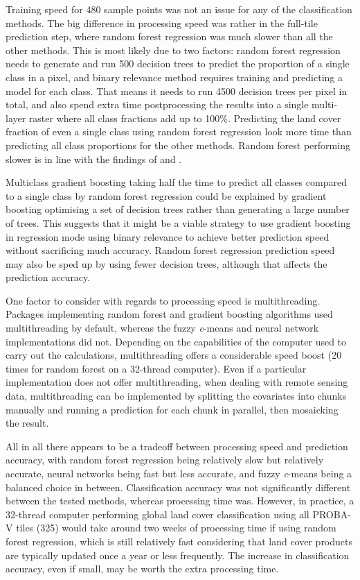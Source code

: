 \documentclass[a4paper,12pt]{scrbook}
\begin{document}
Training speed for 480 sample points was not an issue for any of the classification methods. The big difference in processing speed was rather in the full-tile prediction step, where random forest regression was much slower than all the other methods. This is most likely due to two factors: random forest regression needs to generate and run 500 decision trees to predict the proportion of a single class in a pixel, and binary relevance method requires training and predicting a model for each class. That means it needs to run 4500 decision trees per pixel in total, and also spend extra time postprocessing the results into a single multi-layer raster where all class fractions add up to 100\%. Predicting the land cover fraction of even a single class using random forest regression look more time than predicting all class proportions for the other methods. Random forest performing slower is in line with the findings of \citet{walton2008subpixelrf} and \citet{Pelletier2016hardrf}.

Multiclass gradient boosting taking half the time to predict all classes compared to a single class by random forest regression could be explained by gradient boosting optimising a set of decision trees rather than generating a large number of trees. This suggests that it might be a viable strategy to use gradient boosting in regression mode using binary relevance to achieve better prediction speed without sacrificing much accuracy. Random forest regression prediction speed may also be sped up by using fewer decision trees, although that affects the prediction accuracy.

One factor to consider with regards to processing speed is multithreading. Packages implementing random forest and gradient boosting algorithms used multithreading by default, whereas the fuzzy \textit{c}-means and neural network implementations did not. Depending on the capabilities of the computer used to carry out the calculations, multithreading offers a considerable speed boost (20 times for random forest on a 32-thread computer). Even if a particular implementation does not offer multithreading, when dealing with remote sensing data, multithreading can be implemented by splitting the covariates into chunks manually and running a prediction for each chunk in parallel, then mosaicking the result.

All in all there appears to be a tradeoff between processing speed and prediction accuracy, with random forest regression being relatively slow but relatively accurate, neural networks being fast but less accurate, and fuzzy \textit{c}-means being a balanced choice in between. Classification accuracy was not significantly different between the tested methods, whereas processing time was. However, in practice, a 32-thread computer performing global land cover classification using all PROBA-V tiles (325) would take around two weeks of processing time if using random forest regression, which is still relatively fast considering that land cover products are typically updated once a year or less frequently. The increase in classification accuracy, even if small, may be worth the extra processing time.
\end{document}
